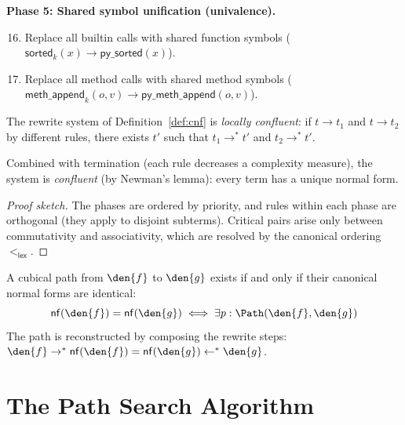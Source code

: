 \begin{definition}
\textbf{Phase 5: Shared symbol unification (univalence).}
\begin{enumerate}
  \setcounter{enumi}{15}
  \item Replace all builtin calls with shared function symbols
    ($\mathsf{sorted}_k(x) \to \mathsf{py\_sorted}(x)$).
  \item Replace all method calls with shared method symbols
    ($\mathsf{meth\_append}_k(o, v) \to
    \mathsf{py\_meth\_append}(o, v)$).
\end{enumerate}
\end{definition}

\begin{theorem}
\label{thm:confluence}
The rewrite system of Definition~\ref{def:cnf} is \emph{locally
confluent}: if $t \to t_1$ and $t \to t_2$ by different rules,
there exists $t'$ such that $t_1 \to^* t'$ and $t_2 \to^* t'$.

Combined with termination (each rule decreases a complexity measure),
the system is \emph{confluent} (by Newman's lemma): every term has
a unique normal form.
\end{theorem}

\begin{proof}[Proof sketch]
The phases are ordered by priority, and rules within each phase are
orthogonal (they apply to disjoint subterms).  Critical pairs arise
only between commutativity and associativity, which are resolved by
the canonical ordering $<_\mathsf{lex}$.
\end{proof}

\begin{corollary}
\label{cor:path-nf}
A cubical path from $\den{f}$ to $\den{g}$ exists if and only if
their canonical normal forms are identical:
\[
  \mathsf{nf}(\den{f}) = \mathsf{nf}(\den{g})
  \iff
  \exists p : \Path(\den{f}, \den{g})
\]
The path is reconstructed by composing the rewrite steps:
$\den{f} \to^* \mathsf{nf}(\den{f}) = \mathsf{nf}(\den{g})
\leftarrow^* \den{g}$.
\end{corollary}

\section{The Path Search Algorithm}

